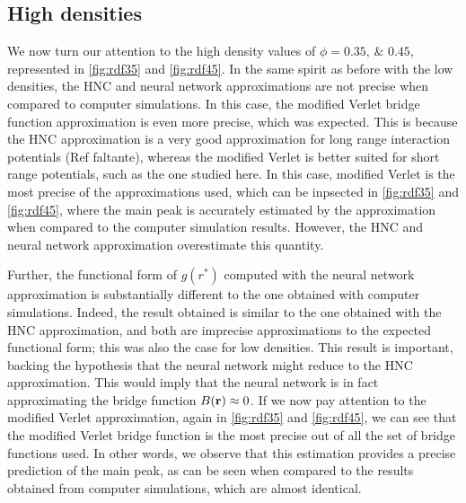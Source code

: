 \subsection{High densities}
We now turn our attention to the high density values of
$\phi=\numlist[list-pair-separator={\enspace\text{and}\enspace}]{0.35; 0.45}$,
represented in \autoref{fig:rdf35} and \ref{fig:rdf45}.
In the same spirit as before with the low densities, the HNC and neural network 
approximations are not precise when compared to computer simulations. In this case,
the modified Verlet bridge function approximation is even more precise, which was expected.
This is because the HNC approximation is a very good approximation for long range
interaction potentials (Ref faltante), whereas the modified Verlet is better suited for 
short range potentials, such as the one studied here.
In this case, modified Verlet is the most precise of the approximations used, which
can be inpsected in \autoref{fig:rdf35} and \autoref{fig:rdf45}, where the 
main peak is accurately estimated by the approximation when compared to the computer 
simulation results. However, the HNC and neural network approximation overestimate this 
quantity.

Further, the functional form of $g(r^*)$ computed with the neural network approximation 
is substantially different to the one obtained with computer simulations. Indeed, the result
obtained is similar to the one obtained with the HNC approximation, and both are imprecise 
approximations to the expected functional form; this was also the case for low densities.
This result is important, backing the hypothesis that the
neural network might reduce to the HNC approximation.
This would imply that the neural network is in fact approximating the bridge function
$B(\mathbf{r}) \approx 0$. If we now pay attention to the modified Verlet
approximation, again in \autoref{fig:rdf35} and \autoref{fig:rdf45}, 
we can see that the modified Verlet bridge function is the most precise
out of all the set of bridge functions used. In other words, we observe that this
estimation provides a precise prediction of the main peak, as can be seen when compared to 
the results obtained from computer simulations, which are almost identical.

